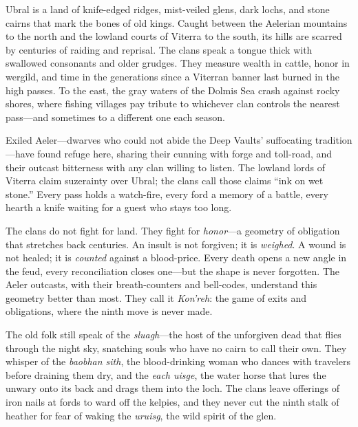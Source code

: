 \vspace{2mm}
\begin{tcolorbox}[colback=black!3,colframe=blue!60!black,title={Theme \& Atmosphere},breakable]
Ubral is a land of knife-edged ridges, mist-veiled glens, dark lochs, and stone cairns that mark the bones of old kings. Caught between the Aelerian mountains to the north and the lowland courts of Viterra to the south, its hills are scarred by centuries of raiding and reprisal. The clans speak a tongue thick with swallowed consonants and older grudges. They measure wealth in cattle, honor in wergild, and time in the generations since a Viterran banner last burned in the high passes. To the east, the gray waters of the Dolmis Sea crash against rocky shores, where fishing villages pay tribute to whichever clan controls the nearest pass---and sometimes to a different one each season.

Exiled Aeler---dwarves who could not abide the Deep Vaults' suffocating tradition---have found refuge here, sharing their cunning with forge and toll-road, and their outcast bitterness with any clan willing to listen. The lowland lords of Viterra claim suzerainty over Ubral; the clans call those claims ``ink on wet stone.'' Every pass holds a watch-fire, every ford a memory of a battle, every hearth a knife waiting for a guest who stays too long.

The clans do not fight for land. They fight for \textit{honor}---a geometry of obligation that stretches back centuries. An insult is not forgiven; it is \textit{weighed}. A wound is not healed; it is \textit{counted} against a blood-price. Every death opens a new angle in the feud, every reconciliation closes one---but the shape is never forgotten. The Aeler outcasts, with their breath-counters and bell-codes, understand this geometry better than most. They call it \textit{Kon'reh}: the game of exits and obligations, where the ninth move is never made.

The old folk still speak of the \textit{sluagh}---the host of the unforgiven dead that flies through the night sky, snatching souls who have no cairn to call their own. They whisper of the \textit{baobhan sith}, the blood-drinking woman who dances with travelers before draining them dry, and the \textit{each uisge}, the water horse that lures the unwary onto its back and drags them into the loch. The clans leave offerings of iron nails at fords to ward off the kelpies, and they never cut the ninth stalk of heather for fear of waking the \textit{uruisg}, the wild spirit of the glen.


\end{tcolorbox}
